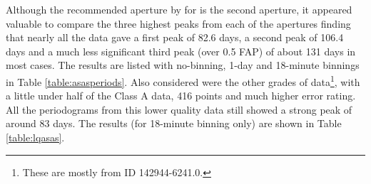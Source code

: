 Although the recommended aperture by {\asas} for {\prox} is the second aperture, it appeared valuable to compare the
three highest peaks from each of the apertures finding that nearly all the data gave a first peak of 82.6 days, a second
peak of 106.4 days and a much less significant third peak (over 0.5 FAP) of about 131 days in most cases. The results
are listed with no-binning, 1-day and 18-minute binnings in Table \ref{table:asasperiods}. Also considered were the
other grades of {\asas} data\footnote{These are mostly from ID 142944-6241.0.}, with a little under half of the Class A
data, 416 points and much higher error rating. All the periodograms from this lower quality data still showed a strong
peak of around 83 days. The results (for 18-minute binning only) are shown in Table \ref{table:lqasas}.

\begin{table}[!htbp]
\centering
{}
\caption{Summary of three strongest periods taken from Class A values in {\asas} dataset for {\prox} from all apertures based upon magnitudes measured
  between December 2000 and September 2009. Results are shown for the raw data. 1-day binning and 18-minute binning.}
\protect\label{table:asasperiods}
\end{table}

